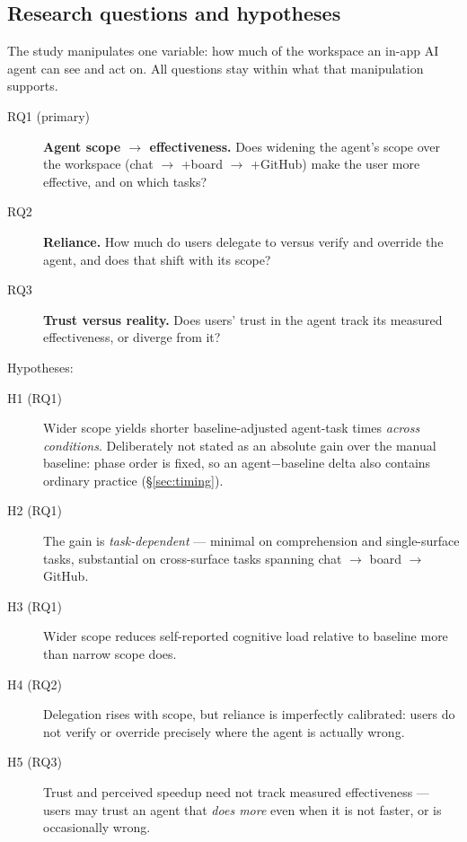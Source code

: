 \documentclass[acmsmall,review,screen]{acmart}
\begin{document}
\subsection{Research questions and hypotheses}

The study manipulates one variable: how much of the workspace an in-app AI
agent can see and act on. All questions stay within what that manipulation
supports.

\begin{description}
  \item[RQ1 (primary)] \textbf{Agent scope $\rightarrow$ effectiveness.} Does
    widening the agent's scope over the workspace (chat $\rightarrow$ +board
    $\rightarrow$ +GitHub) make the user more effective, and on which tasks?
  \item[RQ2] \textbf{Reliance.} How much do users delegate to versus verify
    and override the agent, and does that shift with its scope?
  \item[RQ3] \textbf{Trust versus reality.} Does users' trust in the agent
    track its measured effectiveness, or diverge from it?
\end{description}

\noindent Hypotheses:

\begin{description}
  \item[H1 (RQ1)] Wider scope yields shorter baseline-adjusted agent-task times
    \emph{across conditions}. Deliberately not stated as an absolute gain over
    the manual baseline: phase order is fixed, so an agent$-$baseline delta also
    contains ordinary practice (\S\ref{sec:timing}).
  \item[H2 (RQ1)] The gain is \emph{task-dependent} --- minimal on comprehension
    and single-surface tasks, substantial on cross-surface tasks spanning chat
    $\rightarrow$ board $\rightarrow$ GitHub.
  \item[H3 (RQ1)] Wider scope reduces self-reported cognitive load relative to
    baseline more than narrow scope does.
  \item[H4 (RQ2)] Delegation rises with scope, but reliance is imperfectly
    calibrated: users do not verify or override precisely where the agent is
    actually wrong.
  \item[H5 (RQ3)] Trust and perceived speedup need not track measured
    effectiveness --- users may trust an agent that \emph{does more} even when
    it is not faster, or is occasionally wrong.
\end{description}
\end{document}
